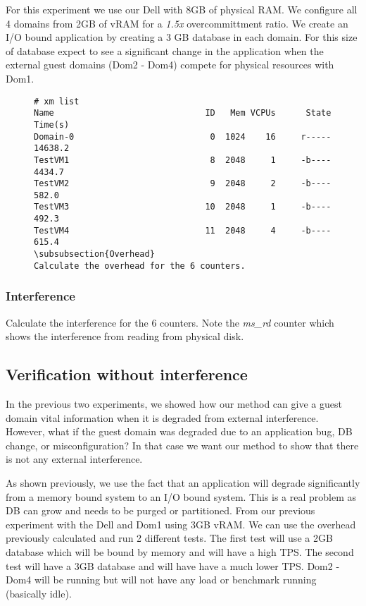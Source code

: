 \indent For this experiment we use our Dell with 8GB of physical RAM.  
We configure all 4 domains from 2GB of vRAM for a \emph{1.5x} overcommittment ratio.  We create an I/O bound application by creating a 3 GB database in each domain.  For this size of database expect to see a significant change in the application when the external guest domains (Dom2 - Dom4) compete for physical resources with Dom1.

\begin{figure}[h]
\begin{Verbatim}
# xm list
Name                              ID   Mem VCPUs      State   Time(s)
Domain-0                           0  1024    16     r-----  14638.2
TestVM1                            8  2048     1     -b----   4434.7
TestVM2                            9  2048     2     -b----    582.0
TestVM3                           10  2048     1     -b----    492.3
TestVM4                           11  2048     4     -b----    615.4
\subsubsection{Overhead}
Calculate the overhead for the 6 counters.
\end{Verbatim}
\end{figure}

\subsubsection{Interference}
Calculate the interference for the 6 counters.  Note the \emph{ms\_rd} counter which shows the interference from reading from physical disk.


\subsection{Verification without interference}
In the previous two experiments, we showed how our method can give a guest domain vital information when it is degraded from external interference.  However, what if the guest domain was degraded due to an application bug, DB change, or misconfiguration?   In that case we want our method to show that there is not any external interference.

\indent As shown previously, we use the fact that an application will degrade significantly from a memory bound system to an I/O bound system.  This is a real problem as DB can grow and needs to be purged or partitioned.  From our previous experiment with the Dell and Dom1 using 3GB vRAM.  We can use the overhead previously calculated and run 2 different tests.  The first test will use a 2GB database which will be bound by memory and will have a high TPS. The second test will have a 3GB database and will have have a much lower TPS.  Dom2 - Dom4 will be running but will not have any load or benchmark running (basically idle).








